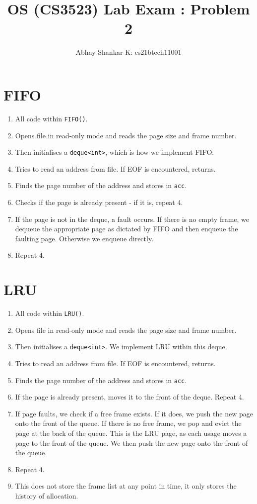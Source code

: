 \documentclass{amsart}
\begin{document}
\newcommand{\me}{
    \author{Abhay Shankar K: cs21btech11001}
    \maketitle
}
    \title{OS (CS3523) Lab Exam : Problem 2}
    \me

    \section{FIFO}
    \begin{enumerate}
        \item All code within \texttt{FIFO()}.
        \item Opens file in read-only mode and reads the page size and frame number. 
        \item Then initialises a \texttt{deque<int>}, which is how we implement FIFO.
        \item Tries to read an address from file. If EOF is encountered, returns. 
        \item Finds the page number of the address and stores in \texttt{acc}.
        \item Checks if the page is already present - if it is, repeat 4.
        \item If the page is not in the deque, a fault occurs. If there is no empty frame, we dequeue the appropriate page as dictated by FIFO and then enqueue the faulting page. Otherwise we enqueue directly.
        \item Repeat 4.
    \end{enumerate}

    \section{LRU}
     \begin{enumerate}
        \item All code within \texttt{LRU()}.
        \item Opens file in read-only mode and reads the page size and frame number. 
        \item Then initialises a \texttt{deque<int>}. We implement LRU within this deque.
        \item Tries to read an address from file. If EOF is encountered, returns. 
        \item Finds the page number of the address and stores in \texttt{acc}.
        \item If the page is already present, moves it to the front of the deque. Repeat 4.
        \item If page faults, we check if a free frame exists. If it does, we push the new page onto the front of the queue. If there is no free frame, we pop and evict the page at the back of the queue. This is the LRU page, as each usage moves a page to the front of the queue. We then push the new page onto the front of the queue.
        \item Repeat 4.
        \item This does not store the frame list at any point in time, it only stores the history of allocation.
    \end{enumerate}
\end{document}
